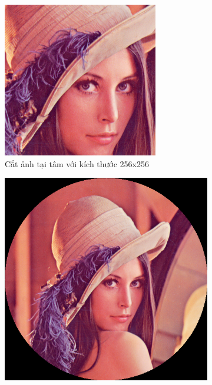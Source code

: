 \documentclass[]{article}
\begin{document}
\begin{figure}[!ht]
  \begin{subfigure}[b]{0.3\linewidth}
    \includegraphics[width=\linewidth]{image/Lenna_center_crop.png}
    \caption{Cắt ảnh tại tâm với kích thước 256x256}
  \end{subfigure}
  \begin{subfigure}[b]{0.3\linewidth}
    \includegraphics[width=\linewidth]{image/Lenna_circular_crop.png}

\end{subfigure}
\end{figure}
\end{document}
